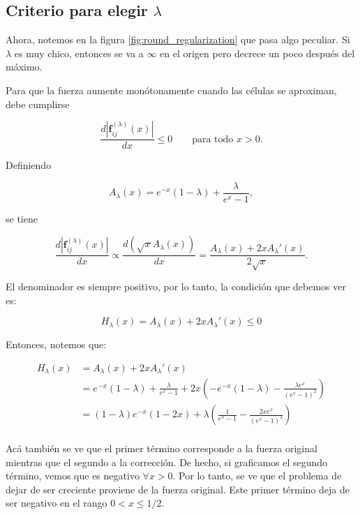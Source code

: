 \documentclass[11pt,a4paper]{article}
\begin{document}
\subsection{Criterio para elegir \texorpdfstring{$\lambda$}{lambda}}

Ahora, notemos en la figura \ref{fig:round_regularization} que pasa algo peculiar. Si $\lambda$ es muy chico, entonces se va a $\infty$ en el origen pero decrece un poco después del máximo.

Para que la fuerza aumente monótonamente cuando las células se aproximan,
debe cumplirse

\begin{equation}
\frac{d\left|\mathbf{ f}_{ij}^{(\lambda)}(x)\right|}{dx}
\leq0
\qquad
\text{para todo }x>0.
\end{equation}

Definiendo

\begin{equation}
A_{\lambda}(x)
=e^{-x}(1-\lambda)
+
\frac{\lambda}
{e^{x}-1},
\end{equation}

se tiene

\begin{equation}
\frac{d\left|\mathbf{ f}_{ij}^{(\lambda)}(x)\right|}{dx}
\propto \frac{d(\sqrt{x}A_{\lambda}(x))}{dx} =
\frac{
A_{\lambda}(x)
+2xA_{\lambda}'(x)
}{2\sqrt{x}}.
\end{equation}

El denominador es siempre positivo, por lo tanto, la condición que debemos ver es:

\begin{equation}
	H_{\lambda}(x)=A_{\lambda}(x)
	+2xA_{\lambda}'(x) \leq 0
\end{equation}

Entonces, notemos que:

\begin{equation}
	\begin{split}
		H_{\lambda}(x)
		&= A_{\lambda}(x)
		+2xA_{\lambda}'(x) \\
		&=e^{-x}(1-\lambda)
		+
		\frac{\lambda}
		{e^{x}-1} +2x\left(-e^{-x}(1-\lambda)
		-
		\frac{\lambda e^{x}}
		{(e^{x}-1)^{2}}\right)\\
		&=(1-\lambda)e^{-x}(1-2x)+ \lambda \left(\frac{1}{e^{x}-1}-\frac{2xe^{x}}{(e^{x}-1)^{2}}\right)\\
	\end{split}
\end{equation}

Acá también se ve que el primer término corresponde a la fuerza original mientras que el segundo a la corrección. De hecho, si graficamos el segundo término, vemos que es negativo $\forall x>0$. Por lo tanto, se ve que el problema de dejar de ser creciente proviene de la fuerza original. Este primer término deja de ser negativo en el rango $0<x\leq1/2$.
\end{document}
